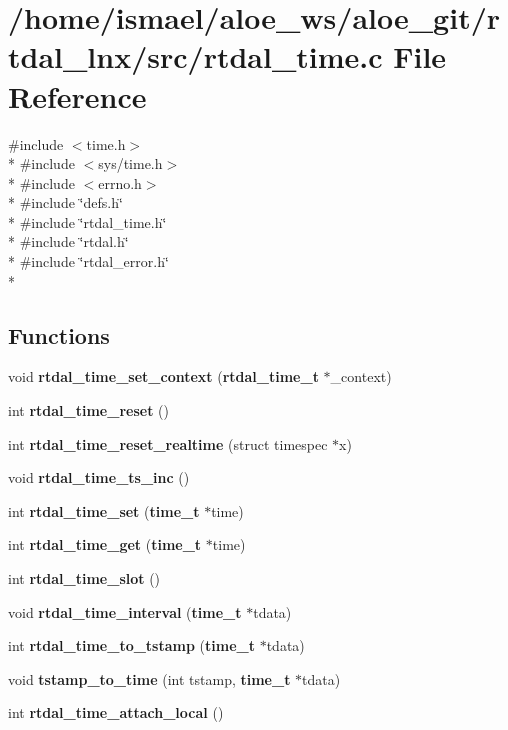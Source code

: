 \section{/home/ismael/aloe\-\_\-ws/aloe\-\_\-git/rtdal\-\_\-lnx/src/rtdal\-\_\-time.c File Reference}
\label{rtdal__time_8c}
{\ttfamily \#include $<$time.\-h$>$}\\*
{\ttfamily \#include $<$sys/time.\-h$>$}\\*
{\ttfamily \#include $<$errno.\-h$>$}\\*
{\ttfamily \#include \char`\"{}defs.\-h\char`\"{}}\\*
{\ttfamily \#include \char`\"{}rtdal\-\_\-time.\-h\char`\"{}}\\*
{\ttfamily \#include \char`\"{}rtdal.\-h\char`\"{}}\\*
{\ttfamily \#include \char`\"{}rtdal\-\_\-error.\-h\char`\"{}}\\*
\subsection*{Functions}
\begin{DoxyCompactItemize}
\item 
void {\bf rtdal\-\_\-time\-\_\-set\-\_\-context} ({\bf rtdal\-\_\-time\-\_\-t} $\ast$\-\_\-context)
\item 
int {\bf rtdal\-\_\-time\-\_\-reset} ()
\item 
int {\bf rtdal\-\_\-time\-\_\-reset\-\_\-realtime} (struct timespec $\ast$x)
\item 
void {\bf rtdal\-\_\-time\-\_\-ts\-\_\-inc} ()
\item 
int {\bf rtdal\-\_\-time\-\_\-set} ({\bf time\-\_\-t} $\ast$time)
\item 
int {\bf rtdal\-\_\-time\-\_\-get} ({\bf time\-\_\-t} $\ast$time)
\item 
int {\bf rtdal\-\_\-time\-\_\-slot} ()
\item 
void {\bf rtdal\-\_\-time\-\_\-interval} ({\bf time\-\_\-t} $\ast$tdata)
\item 
int {\bf rtdal\-\_\-time\-\_\-to\-\_\-tstamp} ({\bf time\-\_\-t} $\ast$tdata)
\item 
void {\bf tstamp\-\_\-to\-\_\-time} (int tstamp, {\bf time\-\_\-t} $\ast$tdata)
\item 
int {\bf rtdal\-\_\-time\-\_\-attach\-\_\-local} ()
\end{DoxyCompactItemize}


